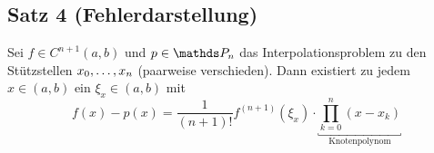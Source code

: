 \subsection{Satz 4 (Fehlerdarstellung)}
\label{sub:satz_4}
Sei $f\in C^{n+1}(a,b)$ und $p\in \Pw_n$ das Interpolationsproblem zu den Stützstellen $x_0, \dots ,x_n$ (paarweise verschieden). 
Dann existiert zu jedem $x\in (a,b)$ ein $\xi_x\in (a,b)$ mit
\[
f(x)-p(x)= \frac{1}{(n+1)!}f^{(n+1)}(\xi_x)\cdot \underbracket{\prod_{k=0}^{n}(x-x_k) }_{\text{Knotenpolynom}}\tag{$\ast$}
\]






























\cleardoubleoddemptypage
{}
\setcounter{page}{1}


\printindex
\listoffigures
